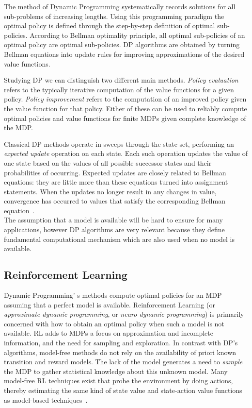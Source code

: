 The method of Dynamic Programming systematically records solutions for all sub-problems of increasing lengths. Using this programming paradigm the optimal policy is defined through the step-by-step definition of optimal sub-policies. According to Bellman optimality principle, all optimal sub-policies of an optimal policy are optimal sub-policies. DP algorithms are obtained by turning Bellman equations into update rules for improving approximations of the desired value functions.


Studying DP we can distinguish two different main methods. \textit{Policy evaluation} refers to the typically iterative computation of the value functions for a given policy. \textit{Policy improvement} refers to the computation of an improved policy given the value function for that policy. Either of these can be used to reliably compute optimal policies and value functions for finite MDPs given complete knowledge of the MDP.


Classical DP methods operate in sweeps through the state set, performing an \textit{expected update} operation on each state. Each such operation updates the value of one state based on the values of all possible successor states and their probabilities of occurring. Expected updates are closely related to Bellman equations: they are little more than these equations turned into assignment statements. When the updates no longer result in any changes in value, convergence has occurred to values that satisfy the corresponding Bellman equation~\cite{SuttonBarto}. \\


The assumption that a model is available will be hard to ensure for many applications, however DP algorithms are very relevant because they define fundamental computational mechanism which are also used when no model is available. 

\subsection{Reinforcement Learning}
Dynamic Programming' s methods compute optimal policies for an MDP assuming that a perfect model is available. Reinforcement Learning (or \textit{approximate dynamic programming}, or \textit{neuro-dynamic programming}) is primarily concerned with how to obtain an optimal policy when such a model is not available. RL adds to MDPs a focus on approximation and incomplete information, and the need for sampling and exploration. In contrast with DP's algorithms, model-free methods do not rely on the availability of priori known transition and reward models. The lack of the model generates a need to \textit{sample} the MDP to gather statistical knowledge about this unknown model. Many model-free RL techniques exist that probe the environment by doing actions, thereby estimating the same kind of state value and state-action value functions as model-based techniques~\cite{wiering2012reinforcement}.\\

